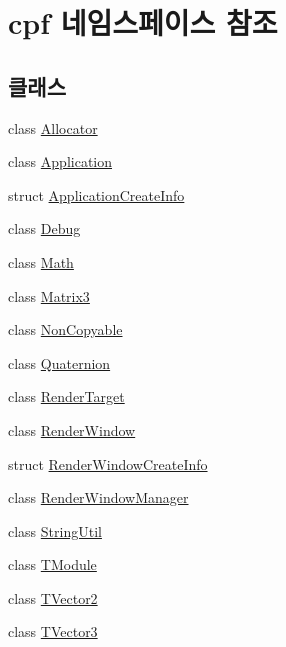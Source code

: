 \hypertarget{namespacecpf}{}\section{cpf 네임스페이스 참조}
\label{namespacecpf}
\subsection*{클래스}
\begin{DoxyCompactItemize}
\item 
class \hyperlink{classcpf_1_1_allocator}{Allocator}
\item 
class \hyperlink{classcpf_1_1_application}{Application}
\item 
struct \hyperlink{structcpf_1_1_application_create_info}{Application\+Create\+Info}
\item 
class \hyperlink{classcpf_1_1_debug}{Debug}
\item 
class \hyperlink{classcpf_1_1_math}{Math}
\item 
class \hyperlink{classcpf_1_1_matrix3}{Matrix3}
\item 
class \hyperlink{classcpf_1_1_non_copyable}{Non\+Copyable}
\item 
class \hyperlink{classcpf_1_1_quaternion}{Quaternion}
\item 
class \hyperlink{classcpf_1_1_render_target}{Render\+Target}
\item 
class \hyperlink{classcpf_1_1_render_window}{Render\+Window}
\item 
struct \hyperlink{structcpf_1_1_render_window_create_info}{Render\+Window\+Create\+Info}
\item 
class \hyperlink{classcpf_1_1_render_window_manager}{Render\+Window\+Manager}
\item 
class \hyperlink{classcpf_1_1_string_util}{String\+Util}
\item 
class \hyperlink{classcpf_1_1_t_module}{T\+Module}
\item 
class \hyperlink{classcpf_1_1_t_vector2}{T\+Vector2}
\item 
class \hyperlink{classcpf_1_1_t_vector3}{T\+Vector3}
\end{DoxyCompactItemize}
